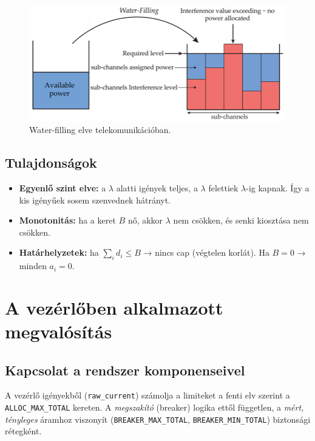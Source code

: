 \begin{figure}
    \centering
    \includegraphics[width=1\textwidth]{figures/Principle-of-Water-Filling-algorithm-76.png}
    \caption{Water-filling elve telekomunikációban. \cite{Slacik2021Sensors}}
    \label{fig:water-filling}
\end{figure}

\subsection{Tulajdonságok}
\begin{itemize}
  \item \textbf{Egyenlő szint elve:} a \(\lambda\) alatti igények teljes, a \(\lambda\) 
  felettiek \(\lambda\)-ig kapnak. Így a kis igényűek sosem szenvednek hátrányt.
  \item \textbf{Monotonitás:} ha a keret \(B\) nő, akkor \(\lambda\) nem csökken, és senki kiosztása nem csökken.
  \item \textbf{Határhelyzetek:} ha \(\sum_i d_i \le B\) → nincs cap (végtelen korlát). Ha \(B=0\) → minden \(a_i=0\).
\end{itemize}

\section{A vezérlőben alkalmazott megvalósítás}

\subsection{Kapcsolat a rendszer komponenseivel}
A vezérlő igényekből (\texttt{raw\_current}) számolja a limiteket a fenti elv szerint 
a \texttt{ALLOC\_MAX\_TOTAL} kereten. A \emph{megszakító} (breaker) logika ettől független, 
a \emph{mért, tényleges} áramhoz viszonyít (\texttt{BREAKER\_MAX\_TOTAL}, \texttt{BREAKER\_MIN\_TOTAL}) 
biztonsági rétegként.

